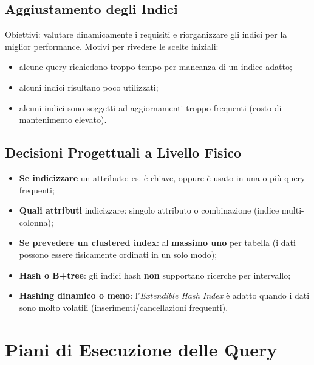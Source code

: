\documentclass[12pt, a4paper]{article}
\begin{document}
\subsection{Aggiustamento degli Indici}
Obiettivi: valutare dinamicamente i requisiti e riorganizzare gli indici per la miglior performance. Motivi per rivedere le scelte iniziali:
\begin{itemize}
    \item alcune query richiedono troppo tempo per mancanza di un indice adatto;
    \item alcuni indici risultano poco utilizzati;
    \item alcuni indici sono soggetti ad aggiornamenti troppo frequenti (costo di mantenimento elevato).
\end{itemize}

\subsection{Decisioni Progettuali a Livello Fisico}
\begin{itemize}
    \item \textbf{Se indicizzare} un attributo: es. è chiave, oppure è usato in una o più query frequenti;
    \item \textbf{Quali attributi} indicizzare: singolo attributo o combinazione (indice multi-colonna);
    \item \textbf{Se prevedere un clustered index}: al \textbf{massimo uno} per tabella (i dati possono essere fisicamente ordinati in un solo modo);
    \item \textbf{Hash o B+tree}: gli indici hash \textbf{non} supportano ricerche per intervallo;
    \item \textbf{Hashing dinamico o meno}: l'\textit{Extendible Hash Index} è adatto quando i dati sono molto volatili (inserimenti/cancellazioni frequenti).
\end{itemize}


\section{Piani di Esecuzione delle Query}
\end{document}
